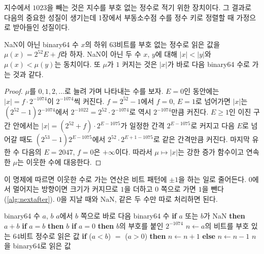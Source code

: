 지수에서 $1023$을 빼는 것은 지수를 부호 없는 정수로 적기 위한 장치이다. 그 결과로 다음의 중요한 성질이 생기는데 1장에서 부동소수점 수를 정수 키로 정렬할 때 가정으로 받아들인 성질이다.

\begin{proposition}
\label{prop:fp-bits-monotone}
NaN이 아닌 binary64 수 $x$의 하위 $63$비트를 부호 없는 정수로 읽은 값을 $\mu(x)=2^{52}E+f$라 하자. NaN이 아닌 두 수 $x$, $y$에 대해 $|x|<|y|$와 $\mu(x)<\mu(y)$는 동치이다. 또 $\mu$가 $1$ 커지는 것은 $|x|$가 바로 다음 binary64 수로 가는 것과 같다.
\end{proposition}

\begin{proof}
$\mu$를 $0,1,2,\dots$로 늘려 가며 나타내는 수를 보자. $E=0$인 동안에는 $|x|=f\cdot2^{-1074}$이 $2^{-1074}$씩 커진다. $f=2^{52}-1$에서 $f=0$, $E=1$로 넘어가면 $|x|$는 $(2^{52}-1)2^{-1074}$에서 $2^{-1022}=2^{52}\cdot2^{-1074}$로 역시 $2^{-1074}$만큼 커진다. $E\ge1$인 이진 구간 안에서는 $|x|=(2^{52}+f)\cdot2^{E-1075}$가 일정한 간격 $2^{E-1075}$로 커지고 다음 $E$로 넘어갈 때도 $(2^{53}-1)2^{E-1075}$에서 $2^{52}\cdot2^{E+1-1075}$로 같은 간격만큼 커진다. 마지막 유한 수 다음의 $E=2047$, $f=0$은 $+\infty$이다. 따라서 $\mu\mapsto|x|$는 강한 증가 함수이고 연속한 $\mu$는 이웃한 수에 대응한다.
\end{proof}

이 명제에 따르면 이웃한 수로 가는 연산은 비트 패턴에 $\pm1$을 하는 일로 줄어든다. $0$에서 멀어지는 방향이면 크기가 커지므로 $1$을 더하고 $0$ 쪽으로 가면 $1$을 뺀다(\cref{alg:nextafter}). $0$을 지날 때와 NaN, 같은 두 수만 따로 처리하면 된다.

\begin{algorithm}[htbp]
\begin{algorithmic}[1]
\Require binary64 수 $a$, $b$
\Ensure $a$에서 $b$ 쪽으로 바로 다음 binary64 수
\State \textbf{if} $a$ 또는 $b$가 NaN \textbf{then} \Return $a+b$ 
\State \textbf{if} $a=b$ \textbf{then} \Return $b$ 
\State \textbf{if} $a=0$ \textbf{then} \Return $b$의 부호를 붙인 $2^{-1074}$
\State $n\gets a$의 비트를 부호 있는 $64$비트 정수로 읽은 값
\State \textbf{if} ($a<b$) $=$ ($a>0$) \textbf{then} $n\gets n+1$ \textbf{else} $n\gets n-1$ 
\State \Return $n$을 binary64로 읽은 값 
\end{algorithmic}
\caption{비트 패턴으로 걷는  (stardust 의 )}
\label{alg:nextafter}
\end{algorithm}

